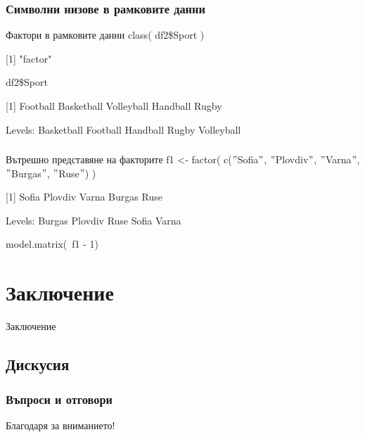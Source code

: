 \documentclass{beamer}
\begin{document}
\begin{frame}
\frametitle{Символни низове в рамковите данни}
\begin{block}{Фактори в рамковите данни}
class( df2\$Sport )

[1] "factor"

df2\$Sport

[1] Football   Basketball Volleyball Handball   Rugby   
  
Levels: Basketball Football Handball Rugby Volleyball
\end{block}
\end{frame}

\begin{frame}
\frametitle{}
\begin{block}{Вътрешно представяне на факторите}
f1 <- factor( c($"$Sofia$"$, $"$Plovdiv$"$, $"$Varna$"$, $"$Burgas$"$, $"$Ruse$"$) )

[1] Sofia   Plovdiv Varna   Burgas  Ruse   

Levels: Burgas Plovdiv Ruse Sofia Varna

model.matrix(~f1 - 1)
\end{block}
\end{frame}

\section{Заключение}

\begin{frame}
\center \huge{Заключение}
\end{frame}

\subsection{Дискусия}

\begin{frame}
\frametitle{Въпроси и отговори}
\center \huge{Благодаря за вниманието!}
\end{frame}
\end{document}

